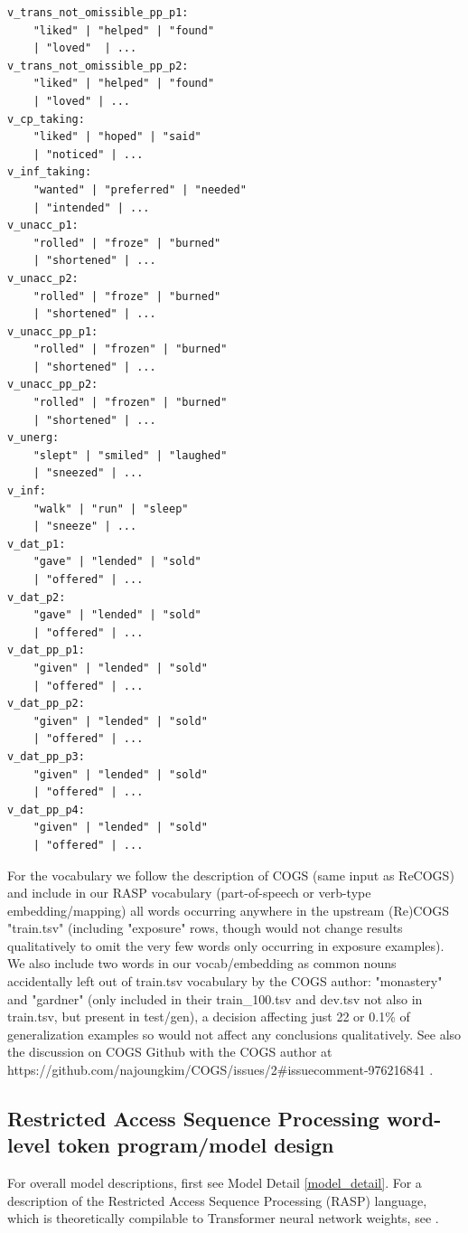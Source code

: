 \documentclass[11pt]{article}
\begin{document}
\begin{tiny}
\begin{verbatim}
v_trans_not_omissible_pp_p1: 
    "liked" | "helped" | "found" 
    | "loved"  | ...
v_trans_not_omissible_pp_p2: 
    "liked" | "helped" | "found" 
    | "loved" | ...
v_cp_taking: 
    "liked" | "hoped" | "said" 
    | "noticed" | ...
v_inf_taking: 
    "wanted" | "preferred" | "needed" 
    | "intended" | ...
v_unacc_p1: 
    "rolled" | "froze" | "burned" 
    | "shortened" | ...
v_unacc_p2: 
    "rolled" | "froze" | "burned" 
    | "shortened" | ...
v_unacc_pp_p1: 
    "rolled" | "frozen" | "burned" 
    | "shortened" | ...
v_unacc_pp_p2: 
    "rolled" | "frozen" | "burned" 
    | "shortened" | ...
v_unerg: 
    "slept" | "smiled" | "laughed" 
    | "sneezed" | ...
v_inf: 
    "walk" | "run" | "sleep" 
    | "sneeze" | ...
v_dat_p1: 
    "gave" | "lended" | "sold" 
    | "offered" | ...
v_dat_p2: 
    "gave" | "lended" | "sold" 
    | "offered" | ...
v_dat_pp_p1: 
    "given" | "lended" | "sold" 
    | "offered" | ...
v_dat_pp_p2: 
    "given" | "lended" | "sold" 
    | "offered" | ...
v_dat_pp_p3: 
    "given" | "lended" | "sold" 
    | "offered" | ...
v_dat_pp_p4: 
    "given" | "lended" | "sold" 
    | "offered" | ...
\end{verbatim}
\end{tiny}

For the vocabulary we follow the \cite{klinger2024compositionalprogramgenerationfewshot} description of COGS (same input as ReCOGS) and include in our RASP vocabulary (part-of-speech or verb-type embedding/mapping) all words occurring anywhere in the upstream (Re)COGS "train.tsv" (including "exposure" rows, though would not change results qualitatively to omit the very few words only occurring in exposure examples). We also include two words in our vocab/embedding as common nouns accidentally left out of train.tsv vocabulary by the COGS author: "monastery" and "gardner" (only included in their train\_100.tsv and dev.tsv not also in train.tsv, but present in test/gen), a decision affecting just 22 or 0.1\% of generalization examples so would not affect any conclusions qualitatively. See also the discussion on COGS Github with the COGS author at https://github.com/najoungkim/COGS/issues/2\#issuecomment-976216841 .
\clearpage

\subsection{Restricted Access Sequence Processing word-level token program/model design}
\label{rasp-word-level-model-design}

For overall model descriptions, first see Model Detail \ref{model_detail}.
For a description of the Restricted Access Sequence Processing (RASP) language, which is theoretically compilable to Transformer neural network weights, see \cite{Weiss2021}.
\end{document}
